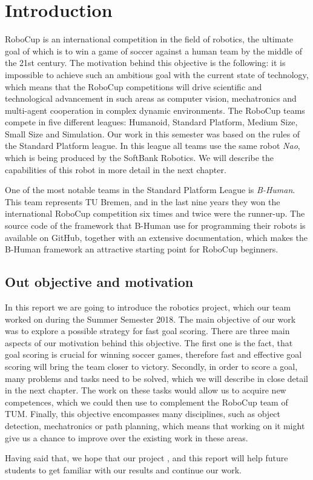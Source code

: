 \chapter{Introduction}

RoboCup is an international competition in the field of robotics, the
ultimate goal of which is to win a game of soccer against a human team by the
middle of the 21st century. The motivation behind this objective is the
following: it is impossible to achieve such an ambitious goal with the current
state of technology, which means that the RoboCup competitions will drive
scientific and technological advancement in such areas as computer vision,
mechatronics and multi-agent cooperation in complex dynamic environments. The
RoboCup teams compete in five different leagues: Humanoid, Standard Platform,
Medium Size, Small Size and Simulation. Our work in this semester was based on
the rules of the Standard Platform league. In this league all teams use the
same robot \textit{Nao}, which is being produced by the SoftBank Robotics. We
will describe the capabilities of this robot in more detail in the next
chapter.

One of the most notable teams in the Standard Platform League is
\textit{B-Human}. This team represents TU Bremen, and in the last nine years
they won the international RoboCup competition six times and twice were the
runner-up. The source code of the framework that B-Human use for programming
their robots is available on GitHub, together with an extensive documentation,
which makes the B-Human framework an attractive starting point for RoboCup
beginners.

\section{Out objective and motivation}

In this report we are going to introduce the robotics project, which our team
worked on during the Summer Semester 2018. The main objective of our work was
to explore a possible strategy for fast goal scoring. There are three main
aspects of our motivation behind this objective. The first one is the fact,
that goal scoring is crucial for winning soccer games, therefore fast and
effective goal scoring will bring the team closer to victory. Secondly, in
order to score a goal, many problems and tasks need to be solved, which we will
describe in close detail in the next chapter. The work on these tasks would
allow us to acquire new competences, which we could then use to complement the
RoboCup team of TUM. Finally, this objective encompasses many disciplines, such
as object detection, mechatronics or path planning, which means that working on
it might give us a chance to improve over the existing work in these areas.

Having said that, we hope that our project , and this report
will help future students to get familiar with our results and continue our
work.
